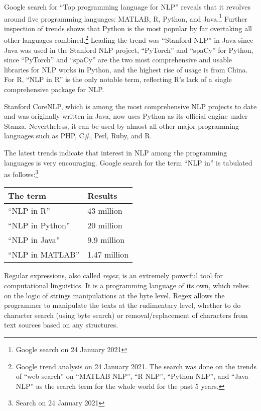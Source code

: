 \documentclass[
]{article}
\begin{document}
Google search for ``Top programming language for NLP'' reveals that it revolves around five programming languages: MATLAB, R, Python, and Java.\footnote{Google search on 24 January 2021} Further inspection of trends shows that Python is the most popular by far overtaking all other languages combined.\footnote{Google trend analysis on 24 January 2021. The search was done on the trends of ``web search'' on ``MATLAB NLP'', ``R NLP'', ``Python NLP'', and ``Java NLP'' as the search term for the whole world for the past 5 years.} Leading the trend was ``Stanford NLP'' in Java since Java was used in the Stanford NLP project, ``PyTorch'' and ``spaCy'' for Python, since ``PyTorch'' and ``spaCy'' are the two most comprehensive and usable libraries for NLP works in Python, and the highest rise of usage is from China. For R, ``NLP in R'' is the only notable term, reflecting R's lack of a single comprehensive package for NLP.

Stanford CoreNLP, which is among the most comprehensive NLP projects to date and was originally written in Java, now uses Python as its official engine under Stanza. Nevertheless, it can be used by almost all other major programming languages such as PHP, C\#, Perl, Ruby, and R.

The latest trends indicate that interest in NLP among the programming languages is very encouraging. Google search for the term ``NLP in'' is tabulated as follows:\footnote{Search on 24 January 2021}

\begin{longtable}[]{@{}ll@{}}
\toprule\noalign{}
The term & Results \\
\midrule\noalign{}
\endhead
\bottomrule\noalign{}
\endlastfoot
``NLP in R'' & 43 million \\
``NLP in Python'' & 20 million \\
``NLP in Java'' & 9.9 million \\
``NLP in MATLAB'' & 1.47 million \\
\end{longtable}

Regular expressions, also called \emph{regex}, is an extremely powerful tool for computational linguistics. It is a programming language of its own, which relies on the logic of strings manipulations at the byte level. Regex allows the programmer to manipulate the texts at the rudimentary level, whether to do character search (using byte search) or removal/replacement of characters from text sources based on any structures.
\end{document}
